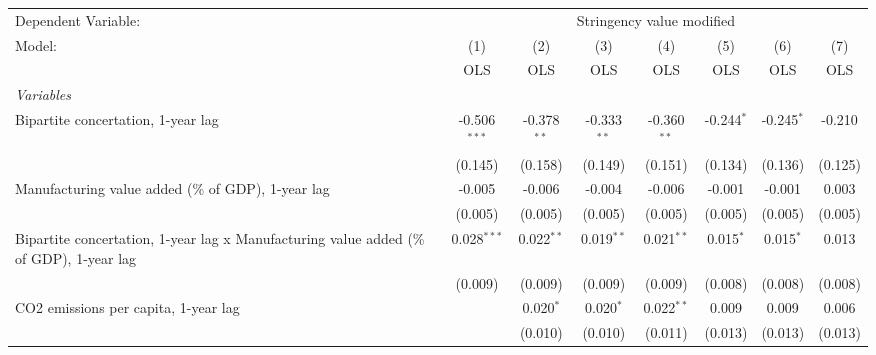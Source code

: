 
\begingroup
\centering
\begin{tabular}{lccccccc}
   \toprule
   Dependent Variable: & \multicolumn{7}{c}{Stringency value modified}\\
   Model:                                                                                  & (1)            & (2)           & (3)           & (4)           & (5)          & (6)          & (7)\\  
                                                                                           &  OLS           & OLS           & OLS           & OLS           & OLS          & OLS          & OLS\\  
   \midrule
   \emph{Variables}\\
   Bipartite concertation, 1-year lag                                                      & -0.506$^{***}$ & -0.378$^{**}$ & -0.333$^{**}$ & -0.360$^{**}$ & -0.244$^{*}$ & -0.245$^{*}$ & -0.210\\   
                                                                                           & (0.145)        & (0.158)       & (0.149)       & (0.151)       & (0.134)      & (0.136)      & (0.125)\\   
   Manufacturing value added (\% of GDP), 1-year lag                                       & -0.005         & -0.006        & -0.004        & -0.006        & -0.001       & -0.001       & 0.003\\   
                                                                                           & (0.005)        & (0.005)       & (0.005)       & (0.005)       & (0.005)      & (0.005)      & (0.005)\\   
   Bipartite concertation, 1-year lag x Manufacturing value added (\% of GDP), 1-year lag  & 0.028$^{***}$  & 0.022$^{**}$  & 0.019$^{**}$  & 0.021$^{**}$  & 0.015$^{*}$  & 0.015$^{*}$  & 0.013\\   
                                                                                           & (0.009)        & (0.009)       & (0.009)       & (0.009)       & (0.008)      & (0.008)      & (0.008)\\   
   CO2 emissions per capita, 1-year lag                                                    &                & 0.020$^{*}$   & 0.020$^{*}$   & 0.022$^{**}$  & 0.009        & 0.009        & 0.006\\   
                                                                                           &                & (0.010)       & (0.010)       & (0.011)       & (0.013)      & (0.013)      & (0.013)\\   

\end{tabular}

